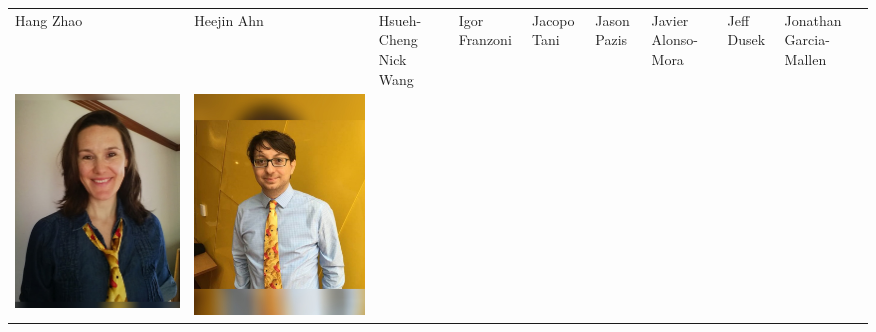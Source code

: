 \documentclass[landscape,a0paper,fontscale=0.292]{baposter}
\begin{document}
\begin{poster}
{\begin{center}
\begin{tabularx}{\linewidth}{X X X X X X X X X}
{\tiny \centering Hang Zhao }& {\tiny \centering Heejin Ahn }& {\tiny \centering Hsueh-Cheng Nick Wang }& {\tiny \centering Igor Franzoni }& {\tiny \centering Jacopo Tani }& {\tiny \centering Jason Pazis }& {\tiny \centering Javier Alonso-Mora }& {\tiny \centering Jeff Dusek }& {\tiny \centering Jonathan Garcia-Mallen }\\ 
 {\centering \includegraphics[width=0.65\linewidth]{bowser.jpg}}&
{\centering \includegraphics[width=0.65\linewidth]{carlone.jpg}}&

\end{tabularx}
\end{center}}
\end{poster}
\end{document}
